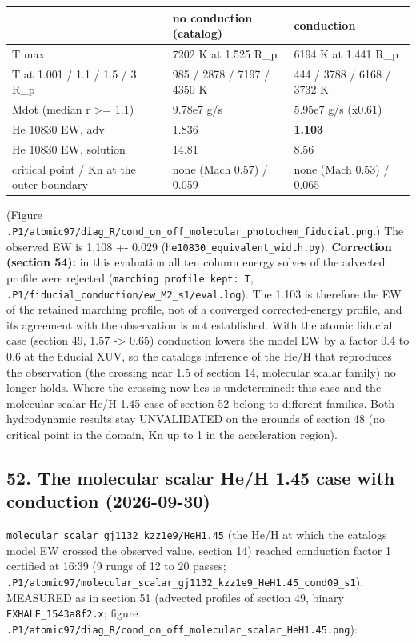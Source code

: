 \documentclass[english,a4paper]{my_memo}
\begin{document}
{\def\LTcaptype{none} %
{\small
\begin{longtable}[]{@{}lll@{}}
\toprule\noalign{}
& no conduction (catalog) & conduction \\
\midrule\noalign{}
\endhead
\bottomrule\noalign{}
\endlastfoot
T max & 7202 K at 1.525 R\_p & 6194 K at 1.441 R\_p \\
T at 1.001 / 1.1 / 1.5 / 3 R\_p & 985 / 2878 / 7197 / 4350 K & 444 / 3788 / 6168 / 3732 K \\
Mdot (median r \textgreater= 1.1) & 9.78e7 g/s & 5.95e7 g/s (x0.61) \\
He 10830 EW, adv & 1.836 & \textbf{1.103} \\
He 10830 EW, solution & 14.81 & 8.56 \\
critical point / Kn at the outer boundary & none (Mach 0.57) / 0.059 & none (Mach 0.53) / 0.065 \\
\end{longtable}
}
}

(Figure \texttt{.P1/atomic97/diag\_R/cond\_on\_off\_molecular\_photochem\_fiducial.png}.)
The observed EW is 1.108 +- 0.029 (\texttt{he10830\_equivalent\_width.py}).
\textbf{Correction (section 54):} in this evaluation all ten column energy
solves of the advected profile were rejected (\texttt{marching\ profile\ kept:\ T},
\texttt{.P1/fiducial\_conduction/ew\_M2\_s1/eval.log}). The 1.103 is therefore the EW
of the retained marching profile, not of a converged corrected-energy
profile, and its agreement with the observation is not established. With the atomic
fiducial case (section 49, 1.57 -\textgreater{} 0.65) conduction lowers the model EW by
a factor 0.4 to 0.6 at the fiducial XUV, so the catalog\textquotesingle s inference of the
He/H that reproduces the observation (the crossing near 1.5 of section 14,
molecular scalar family) no longer holds. Where the crossing now lies is
undetermined: this case and the molecular scalar He/H 1.45 case of section
52 belong to different families. Both hydrodynamic results stay UNVALIDATED on
the grounds of section 48 (no critical point in the domain, Kn up to 1 in
the acceleration region).

\subsection{52. The molecular scalar He/H 1.45 case with conduction (2026-09-30)}\label{52-the-molecular-scalar-heh-145-case-with-conduction-2026-09-30}

\texttt{molecular\_scalar\_gj1132\_kzz1e9/HeH1.45} (the He/H at which the catalog\textquotesingle s
model EW crossed the observed value, section 14) reached conduction factor 1
certified at 16:39 (9 rungs of 12 to 20 passes;
\texttt{.P1/atomic97/molecular\_scalar\_gj1132\_kzz1e9\_HeH1.45\_cond09\_s1}). MEASURED
as in section 51 (advected profiles of section 49, binary
\texttt{EXHALE\_1543a8f2.x}; figure
\texttt{.P1/atomic97/diag\_R/cond\_on\_off\_molecular\_scalar\_HeH1.45.png}):
\end{document}
